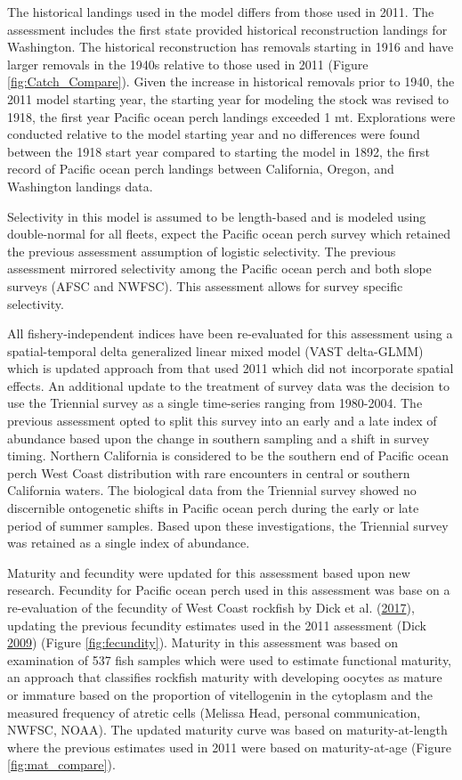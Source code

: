 \documentclass[12pt,]{article}
\begin{document}
The historical landings used in the model differs from those used in
2011. The assessment includes the first state provided historical
reconstruction landings for Washington. The historical reconstruction
has removals starting in 1916 and have larger removals in the 1940s
relative to those used in 2011 (Figure \ref{fig:Catch_Compare}). Given
the increase in historical removals prior to 1940, the 2011 model
starting year, the starting year for modeling the stock was revised to
1918, the first year Pacific ocean perch landings exceeded 1 mt.
Explorations were conducted relative to the model starting year and no
differences were found between the 1918 start year compared to starting
the model in 1892, the first record of Pacific ocean perch landings
between California, Oregon, and Washington landings data.

Selectivity in this model is assumed to be length-based and is modeled
using double-normal for all fleets, expect the Pacific ocean perch
survey which retained the previous assessment assumption of logistic
selectivity. The previous assessment mirrored selectivity among the
Pacific ocean perch and both slope surveys (AFSC and NWFSC). This
assessment allows for survey specific selectivity.

All fishery-independent indices have been re-evaluated for this
assessment using a spatial-temporal delta generalized linear mixed model
(VAST delta-GLMM) which is updated approach from that used 2011 which
did not incorporate spatial effects. An additional update to the
treatment of survey data was the decision to use the Triennial survey as
a single time-series ranging from 1980-2004. The previous assessment
opted to split this survey into an early and a late index of abundance
based upon the change in southern sampling and a shift in survey timing.
Northern California is considered to be the southern end of Pacific
ocean perch West Coast distribution with rare encounters in central or
southern California waters. The biological data from the Triennial
survey showed no discernible ontogenetic shifts in Pacific ocean perch
during the early or late period of summer samples. Based upon these
investigations, the Triennial survey was retained as a single index of
abundance.

Maturity and fecundity were updated for this assessment based upon new
research. Fecundity for Pacific ocean perch used in this assessment was
base on a re-evaluation of the fecundity of West Coast rockfish by Dick
et al. (\protect\hyperlink{ref-dick_meta-analysis_2017}{2017}), updating
the previous fecundity estimates used in the 2011 assessment (Dick
\protect\hyperlink{ref-dick_modeling_2009}{2009}) (Figure
\ref{fig:fecundity}). Maturity in this assessment was based on
examination of 537 fish samples which were used to estimate functional
maturity, an approach that classifies rockfish maturity with developing
oocytes as mature or immature based on the proportion of vitellogenin in
the cytoplasm and the measured frequency of atretic cells (Melissa Head,
personal communication, NWFSC, NOAA). The updated maturity curve was
based on maturity-at-length where the previous estimates used in 2011
were based on maturity-at-age (Figure \ref{fig:mat_compare}).
\end{document}
